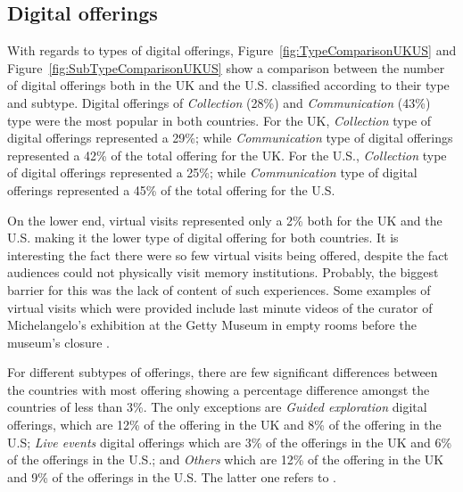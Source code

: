 \documentclass{egpubl}
\begin{document}

\subsection{Digital offerings}
\label{dig}
With regards to types of digital offerings, Figure~\ref{fig:TypeComparisonUKUS} and Figure~\ref{fig:SubTypeComparisonUKUS} show a comparison between the number of digital offerings both in the UK and the U.S. classified according to their type and subtype. Digital offerings of \emph{Collection} (28\%) and \emph{Communication} (43\%) type were the most popular in both countries. For the UK, \emph{Collection} type of digital offerings represented a 29\%; while \emph{Communication} type of digital offerings represented a 42\% of the total offering for the UK. For the U.S., \emph{Collection} type of digital offerings represented a 25\%; while \emph{Communication} type of digital offerings represented a 45\% of the total offering for the U.S. 


On the lower end, virtual visits represented only a 2\% both for the UK and the U.S. making it the lower type of digital offering for both countries. It is interesting the fact there  were so few virtual visits being offered, despite the fact audiences could not physically visit memory institutions. Probably, the biggest barrier for this was the lack of content of such experiences. Some examples of virtual visits which were provided include last minute videos of the curator of Michelangelo's exhibition at the Getty Museum in empty rooms before the museum's closure \cite{getty2020}.  


For different subtypes of offerings, there are few significant differences between the countries with most offering showing a percentage difference amongst the countries of less than 3\%. The only exceptions are \emph{Guided exploration} digital offerings, which are 12\% of the offering in the UK and 8\% of the offering in the U.S; \emph{Live events} digital offerings which are 3\% of the offerings in the UK and 6\% of the offerings in the U.S.; and \emph{Others} which are 12\% of the offering in the UK and 9\% of the offerings in the U.S. The latter one refers to . 
 
\end{document}
